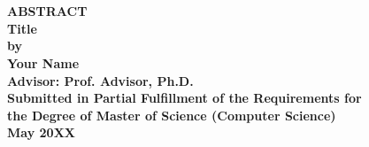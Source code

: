 \documentclass[12pt,letterpaper]{report}
\newcommand{\thesistitle}{Title}
\newcommand{\thesisauthor}{Your Name}
\newcommand{\thesisadvisor}{Advisor}
\newcommand{\graddate}{May 20XX} %
\begin{document}
\section*{}
\begin{center}
{\bfseries 
  \vspace{.25in}  
  {\bf ABSTRACT}\\
  \vspace{.25in}
  {\bf \thesistitle}\\  
  \vspace{.25in}
  {\bf by}\\  
  \vspace{.5in}
  {\bf \thesisauthor}\\
  \vspace{.5in}
  {\bf Advisor: Prof. \thesisadvisor, Ph.D.}\\
  \vspace{.25in}
  {\bf Submitted in Partial Fulfillment of the Requirements for}\\
  {\bf the Degree of Master of Science (Computer Science)}\\
  \vspace{.25in}
  {\bf \graddate}  
  \vspace{.25in}
}
\end{center}

\newpage

\tableofcontents

\listoffigures{}
\newpage

\listoftables{}
\newpage


%
\end{document}
